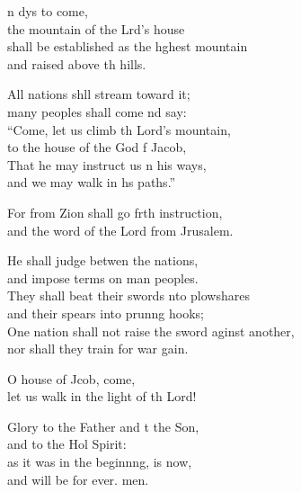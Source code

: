 \settowidth{\versewidth}{One nation shall not raise the sword against another, *}
\begin{psalmverse}%
  \begin{patverse}
n dys to come,\Med\\
the mountain of the Lrd’s house\\
shall be established as the h\pointup{\i}ghest mountain\Med\\
and raised above th hills.

All nations shll stream toward it;\Med\\
many peoples shall come nd say:\\
“Come, let us climb th Lord’s mountain,\Med\\
to the house of the God f Jacob,\\
That he may instruct us \pointup{\i}n his ways, \Med\\
and we may walk in h\pointup{\i}s paths.”

For from Zion shall go frth instruction,\Med\\
and the word of the Lord from Jrusalem.

He shall judge betwen the nations,\Med\\
and impose terms on man peoples.\\
They shall beat their swords \pointup{\i}nto plowshares\Med\\
and their spears into prun\pointup{\i}ng hooks;\\
One nation shall not raise the sword aginst another,\Med\\
nor shall they train for war gain.

O house of Jcob, come,\Med\\
let us walk in the light of th Lord!

Glory to the Father and t the Son,\Med\\
    and to the Hol Spirit:\\
as it was in the beginn\pointup{\i}ng, is now,\Med\\
    and will be for ever. men.
  \end{patverse}
\end{psalmverse}
